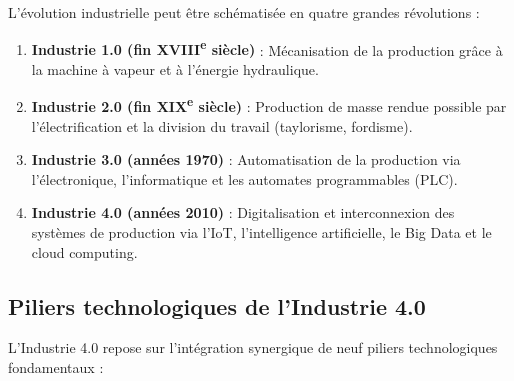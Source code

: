 L'évolution industrielle peut être schématisée en quatre grandes révolutions :

\begin{enumerate}
    \item \textbf{Industrie 1.0 (fin XVIII\textsuperscript{e} siècle)} : Mécanisation de la production grâce à la machine à vapeur et à l'énergie hydraulique.
    
    \item \textbf{Industrie 2.0 (fin XIX\textsuperscript{e} siècle)} : Production de masse rendue possible par l'électrification et la division du travail (taylorisme, fordisme).
    
    \item \textbf{Industrie 3.0 (années 1970)} : Automatisation de la production via l'électronique, l'informatique et les automates programmables (PLC).
    
    \item \textbf{Industrie 4.0 (années 2010)} : Digitalisation et interconnexion des systèmes de production via l'IoT, l'intelligence artificielle, le Big Data et le cloud computing.
\end{enumerate}



\subsection{Piliers technologiques de l'Industrie 4.0}

L'Industrie 4.0 repose sur l'intégration synergique de neuf piliers technologiques fondamentaux :

